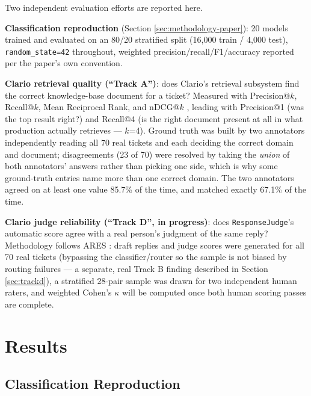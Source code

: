\documentclass[conference]{IEEEtran}
\begin{document}
Two independent evaluation efforts are reported here.

\textbf{Classification reproduction} (Section \ref{sec:methodology-paper}): 20 models trained and evaluated on an 80/20 stratified split (16,000 train / 4,000 test), \texttt{random\_state=42} throughout, weighted precision/recall/F1/accuracy reported per the paper's own convention.

\textbf{Clario retrieval quality (``Track A'')}: does Clario's retrieval subsystem find the correct knowledge-base document for a ticket? Measured with Precision@$k$, Recall@$k$, Mean Reciprocal Rank, and nDCG@$k$ \cite{jarvelin2002ndcg}, leading with Precision@1 (was the top result right?) and Recall@4 (is the right document present at all in what production actually retrieves --- $k$=4). Ground truth was built by two annotators independently reading all 70 real tickets and each deciding the correct domain and document; disagreements (23 of 70) were resolved by taking the \emph{union} of both annotators' answers rather than picking one side, which is why some ground-truth entries name more than one correct domain. The two annotators agreed on at least one value 85.7\% of the time, and matched exactly 67.1\% of the time.

\textbf{Clario judge reliability (``Track D'', in progress)}: does \texttt{ResponseJudge}'s automatic score agree with a real person's judgment of the same reply? Methodology follows ARES \cite{saadfalcon2024ares}: draft replies and judge scores were generated for all 70 real tickets (bypassing the classifier/router so the sample is not biased by routing failures --- a separate, real Track B finding described in Section \ref{sec:trackd}), a stratified 28-pair sample was drawn for two independent human raters, and weighted Cohen's $\kappa$ \cite{cohen1960kappa} will be computed once both human scoring passes are complete.

\section{Results}
\label{sec:results}

\subsection{Classification Reproduction}
\label{sec:results-classification}
\end{document}

